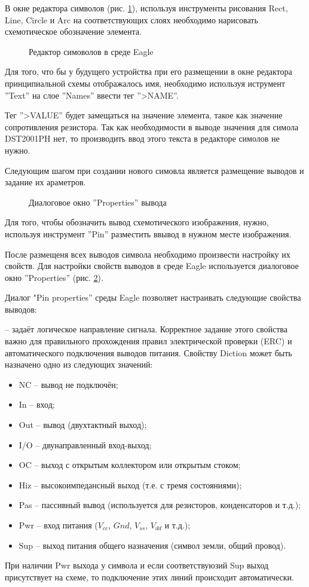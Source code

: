 В окне редактора символов (рис. \ref{img:symbol}), используя инструменты рисования
Rect, Line, Circle и Arc на соответствующих слоях необходимо нарисовать схемотическое
обозначение элемента.
\begin{figure}[h]
	\caption{Редактор симоволов в среде Eagle}
	\label{img:symbol}
\end{figure}
Для того, что бы у будущего устройства при его размещении в окне редактора принципиальной
схемы отображалось имя, необходимо используя иструмент ''Text'' на слое ''Names'' ввести
тег ''>NAME''.

Тег ''>VALUE'' будет замещаться на значение элемента, такое как значение
сопротивления резистора. Так как необходимости в выводе значения для симола DST2001PH нет,
то производить ввод этого текста в редакторе симолов не нужно.

Следующим шагом при создании нового симовла является размещение выводов и задание их
араметров.
\begin{figure}[h]
	\caption{Диалоговое окно ''Properties'' вывода}
	\label{img:pinProperty}
\end{figure}
Для того, чтобы обозначить вывод схемотического изображения, нужно, используя инструмент
''Pin'' разместить ввывод в нужном месте изображения.


После размещеня всех выводов символа необходимо произвести настройку их свойств.
Для настройки свойств выводов в среде Eagle используется диалоговое окно
''Properties'' (рис. \ref{img:pinProperty}).


Диалог "Pin properties'' среды Eagle позволяет настраивать следующие свойства выводов:

 -- задаёт логическое направление сигнала. Корректное задание этого свойства
важно для правильного прохождения правил электрической проверки (ERC) и автоматического
подключения выводов питания. Свойству Diction может быть назначено одно из следующих
значений:
\begin{itemize}
	\item{} NC  -- вывод не подключён;
	\item{} In  -- вход;
	\item{} Out -- вывод (двухтактный выход);
	\item{} I/O -- двунаправленный вход-выход;
	\item{} OC -- выход с открытым коллектором или открытым стоком;
	\item{} Hiz  -- высокоимпедансный выход (т.е. с тремя состояниями);
	\item{} Pas -- пассивный вывод (используется для резисторов, конденсаторов и т.д.);
	\item{} Pwr -- вход питания ($V_{cc}$, $Gnd$, $V_{ss}$, $V_{dd}$ и т.д.);
	\item{} Sup -- выход питания общего назначения (символ земли, общий провод).
\end{itemize}
При наличии Pwr выхода у символа и если соответствуюзий Sup выход присутствует на схеме,
то подключение этих линий происходит автоматически.


